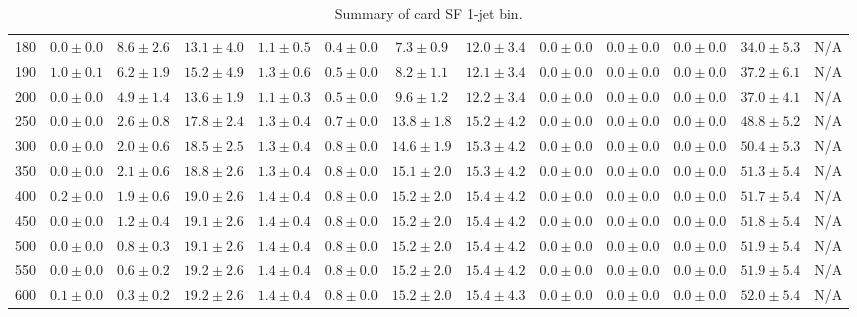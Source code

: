 \begin{table}
{\begin{center}
\begin{tabular}{l | c c | c c c c c c c c  | c c}
180 & $0.0\pm0.0$ & $8.6\pm2.6$ & $13.1\pm4.0$ & $1.1\pm0.5$ & $0.4\pm0.0$ & $7.3\pm0.9$ & $12.0\pm3.4$ & $0.0\pm0.0$ & $0.0\pm0.0$ & $0.0\pm0.0$ & $34.0\pm5.3$ & N/A \\
190 & $1.0\pm0.1$ & $6.2\pm1.9$ & $15.2\pm4.9$ & $1.3\pm0.6$ & $0.5\pm0.0$ & $8.2\pm1.1$ & $12.1\pm3.4$ & $0.0\pm0.0$ & $0.0\pm0.0$ & $0.0\pm0.0$ & $37.2\pm6.1$ & N/A \\
200 & $0.0\pm0.0$ & $4.9\pm1.4$ & $13.6\pm1.9$ & $1.1\pm0.3$ & $0.5\pm0.0$ & $9.6\pm1.2$ & $12.2\pm3.4$ & $0.0\pm0.0$ & $0.0\pm0.0$ & $0.0\pm0.0$ & $37.0\pm4.1$ & N/A \\
250 & $0.0\pm0.0$ & $2.6\pm0.8$ & $17.8\pm2.4$ & $1.3\pm0.4$ & $0.7\pm0.0$ & $13.8\pm1.8$ & $15.2\pm4.2$ & $0.0\pm0.0$ & $0.0\pm0.0$ & $0.0\pm0.0$ & $48.8\pm5.2$ & N/A \\
300 & $0.0\pm0.0$ & $2.0\pm0.6$ & $18.5\pm2.5$ & $1.3\pm0.4$ & $0.8\pm0.0$ & $14.6\pm1.9$ & $15.3\pm4.2$ & $0.0\pm0.0$ & $0.0\pm0.0$ & $0.0\pm0.0$ & $50.4\pm5.3$ &  N/A \\
350 & $0.0\pm0.0$ & $2.1\pm0.6$ & $18.8\pm2.6$ & $1.3\pm0.4$ & $0.8\pm0.0$ & $15.1\pm2.0$ & $15.3\pm4.2$ & $0.0\pm0.0$ & $0.0\pm0.0$ & $0.0\pm0.0$ & $51.3\pm5.4$ &  N/A \\
400 & $0.2\pm0.0$ & $1.9\pm0.6$ & $19.0\pm2.6$ & $1.4\pm0.4$ & $0.8\pm0.0$ & $15.2\pm2.0$ & $15.4\pm4.2$ & $0.0\pm0.0$ & $0.0\pm0.0$ & $0.0\pm0.0$ & $51.7\pm5.4$ &  N/A \\
450 & $0.0\pm0.0$ & $1.2\pm0.4$ & $19.1\pm2.6$ & $1.4\pm0.4$ & $0.8\pm0.0$ & $15.2\pm2.0$ & $15.4\pm4.2$ & $0.0\pm0.0$ & $0.0\pm0.0$ & $0.0\pm0.0$ & $51.8\pm5.4$ &  N/A \\
500 & $0.0\pm0.0$ & $0.8\pm0.3$ & $19.1\pm2.6$ & $1.4\pm0.4$ & $0.8\pm0.0$ & $15.2\pm2.0$ & $15.4\pm4.2$ & $0.0\pm0.0$ & $0.0\pm0.0$ & $0.0\pm0.0$ & $51.9\pm5.4$ &  N/A \\
550 & $0.0\pm0.0$ & $0.6\pm0.2$ & $19.2\pm2.6$ & $1.4\pm0.4$ & $0.8\pm0.0$ & $15.2\pm2.0$ & $15.4\pm4.2$ & $0.0\pm0.0$ & $0.0\pm0.0$ & $0.0\pm0.0$ & $51.9\pm5.4$ &  N/A \\
600 & $0.1\pm0.0$ & $0.3\pm0.2$ & $19.2\pm2.6$ & $1.4\pm0.4$ & $0.8\pm0.0$ & $15.2\pm2.0$ & $15.4\pm4.3$ & $0.0\pm0.0$ & $0.0\pm0.0$ & $0.0\pm0.0$ & $52.0\pm5.4$ &  N/A \\
\hline
\end{tabular}
\end{center}
}
\caption{Summary of card SF 1-jet bin.}
\end{table}
